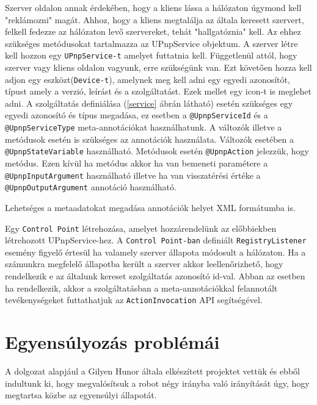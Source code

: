 Szerver oldalon annak érdekében, hogy a kliens lássa a hálózaton úgymond kell "reklámozni" magát. Ahhoz, hogy a kliens megtalálja az általa keresett szervert, felkell fedezze az hálózaton levő szervereket, tehát "hallgatóznia" kell. Az ehhez szükséges metódusokat tartalmazza az UPnpService objektum. A szerver létre kell hozzon egy \texttt{UPnpService-t} amelyet futtatnia kell. Függetlenül attól, hogy szerver vagy kliens oldalon vagyunk, erre szükségünk van. Ezt követően hozza kell adjon egy eszközt(\texttt{Device-t}), amelynek meg kell adni egy egyedi azonosítót, típust amely a verzió, leírást és a szolgáltatást. Ezek mellet egy icon-t is meglehet adni. A szolgáltatás definiálása (\ref{service} ábrán látható) esetén szükséges egy egyedi azonosító és típus megadása, ez esetben a \texttt{@UpnpServiceId} és a \texttt{@UpnpServiceType} meta-annotációkat használhatunk. A változók illetve a metódusok esetén is szükséges az annotációk használata. Változók esetében a \texttt{@UpnpStateVariable} használható. Metódusok esetén \texttt{@UpnpAction} jelezzük, hogy metódus. Ezen kívül ha metódus akkor ha van bemeneti paramétere a \texttt{@UpnpInputArgument} használható illetve ha van visszatérési értéke a \texttt{@UpnpOutputArgument} annotáció használható.

Lehetséges a metaadatokat megadása annotációk helyet XML formátumba is. 



Egy \texttt{Control Point} létrehozása, amelyet hozzárendelünk az előbbiekben létrehozott UPnpService-hez. A \texttt{Control Point-ban} definiált \texttt{RegistryListener} esemény figyelő értesül ha valamely szerver állapota módosult a hálózaton. Ha a számunkra megfelelő állapotba került a szerver akkor leellenőrizhető, hogy rendelkezik e az általunk kereset szolgáltatás azonosító id-val. Abban az esetben ha rendelkezik, akkor a szolgáltatásban a meta-annotációkkal felannotált tevékenységeket futtathatjuk az \texttt{ActionInvocation} API segítségével.

\section{Egyensúlyozás problémái}\label{sec:MEGVALOSITAS:pidModositas}

A dolgozat alapjául a Gilyen Hunor általa elkészített projektet vettük és ebből indultunk ki, hogy megvalósítsuk a robot négy irányba való irányítását úgy, hogy megtartsa közbe az egyensúlyi állapotát.

